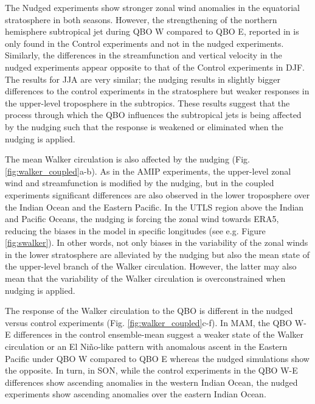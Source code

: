 The Nudged experiments show stronger zonal wind anomalies in the equatorial stratosphere in both seasons. However, the strengthening of the northern hemisphere subtropical jet during QBO W compared to QBO E, reported in \citep{garfinkel2010} is only found in the Control experiments and not in the nudged experiments. 
Similarly, the differences in the streamfunction and vertical velocity in the nudged experiments appear opposite to that of the Control experiments in DJF. 
The results for JJA are very similar; the nudging results in slightly bigger differences to the control experiments in the stratosphere but weaker responses in the upper-level troposphere in the subtropics.
These results suggest that the process through which the QBO influences the subtropical jets is being affected by the nudging such that the response is weakened or eliminated when the nudging is applied.


The mean Walker circulation is also affected by the nudging (Fig. \ref{fig:walker_coupled}a-b). As in the AMIP experiments, the upper-level zonal wind and streamfunction is modified by the nudging, but in the coupled experiments significant differences are also observed in the lower troposphere over the Indian Ocean and the Eastern Pacific. 
In the UTLS region above the Indian and Pacific Oceans, the nudging is forcing the zonal wind towards ERA5,  reducing the biases in the model in specific longitudes (see e.g. Figure \ref{fig:swalker}). In other words, not only biases in the variability of the zonal winds in the lower stratosphere are alleviated by the nudging but also the mean state of the upper-level branch of the Walker circulation. However, the latter may also mean that the variability of the Walker circulation is overconstrained when nudging is applied. 

The response of the Walker circulation to the QBO is different in the nudged versus control experiments (Fig. \ref{fig:walker_coupled}c-f). In MAM, the QBO W-E differences in the control ensemble-mean suggest a weaker state of the Walker circulation or an El Niño-like pattern with anomalous ascent in the Eastern Pacific under QBO W compared to QBO E whereas the nudged simulations show the opposite. 
In turn, in SON, while the control experiments in the QBO W-E differences show ascending anomalies in the western Indian Ocean, the nudged experiments show ascending anomalies over the eastern Indian Ocean. 

